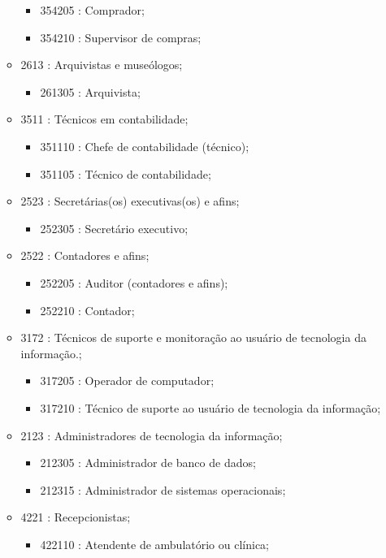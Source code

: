 \begin{itemize}
\begin{itemize}
\begin{itemize}
      \item 354205 : Comprador;
      \item 354210 : Supervisor de compras;
    \end{itemize}
    \item 2613 : Arquivistas e museólogos;
    \begin{itemize}
      \item 261305 : Arquivista;
    \end{itemize}
    \item 3511 : Técnicos em contabilidade;
    \begin{itemize}
      \item 351110 : Chefe de contabilidade (técnico);
      \item 351105 : Técnico de contabilidade;
    \end{itemize}
    \item 2523 : Secretárias(os) executivas(os) e afins;
    \begin{itemize}
      \item 252305 : Secretário executivo;
    \end{itemize}
    \item 2522 : Contadores e afins;
    \begin{itemize}
      \item 252205 : Auditor (contadores e afins);
      \item 252210 : Contador;
    \end{itemize}
    \item 3172 : Técnicos de suporte e monitoração ao usuário de tecnologia da informação.;
    \begin{itemize}
      \item 317205 : Operador de computador;
      \item 317210 : Técnico de suporte ao usuário de tecnologia da informação;
    \end{itemize}
    \item 2123 : Administradores de tecnologia da informação;
    \begin{itemize}
      \item 212305 : Administrador de banco de dados;
      \item 212315 : Administrador de sistemas operacionais;
    \end{itemize}
    \item 4221 : Recepcionistas;
    \begin{itemize}
      \item 422110 : Atendente de ambulatório ou clínica;

\end{itemize}
\end{itemize}
\end{itemize}
